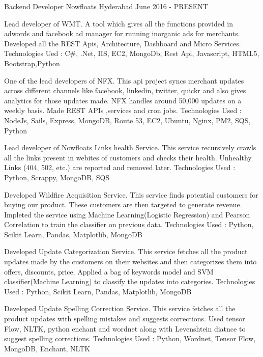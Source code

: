 

\begin{cventries}

  \cventry
    {Backend Developer} %
    {Nowfloats} %
    {Hyderabad} %
    {June 2016 - PRESENT} %
    {
      \begin{cvitems} %
        \item {Lead developer of WMT. A tool which gives all the functions provided in adwords and facebook ad manager for running inorganic ads for merchants. Developed all the REST Apis, Architecture, Dashboard and Micro Services. Technologies Ued : C\#, .Net, IIS, EC2, MongoDb, Rest Api, Javascript, HTML5, Bootstrap,Python}
        \item {One of the lead developers of NFX. This api project syncs merchant updates across different channels like facebook, linkedin, twitter, quickr and also gives analytics for those updates made. NFX handles around 50,000 updates on a weekly basis. Made REST APIs ,services and cron jobs. Technologies Used : NodeJs, Sails, Express, MongoDB, Route 53, EC2, Ubuntu, Nginx, PM2, SQS, Python}
        \item {Lead developer of Nowfloats Links health Service. This service recursively crawls all the links present in webites of customers and checks their health. Unhealthy Links (404, 502, etc.) are reported and removed later. Technologies Used : Python, Scrappy, MongoDB, SQS  }
        \item {Developed Wildfire Acquisition Service. This service finds potential customers for buying our product. These customers are then targeted to generate revenue. Impleted the service using Machine Learning(Logistic Regression) and Pearson Correlation to train the classifier on previous data. Technologies Used : Python, Scikit Learn, Pandas, Matplotlib, MongoDB  }
        \item {Developed Update Categorization Service. This service fetches all the product updates made by the customers on their websites and then categorizes them into offers, discounts, price. Applied a bag of keywords model and SVM classifier(Machine Learning) to classify the updates into categories. Technologies Used : Python, Scikit Learn, Pandas, Matplotlib, MongoDB  }
        \item {Developed Update Spelling Correction Service. This service fetches all the product updates with spelling mistakes and suggests corrections. Used tensor Flow, NLTK, python enchant and wordnet along with Levenshtein diatnce to suggest spelling corrections. Technologies Used : Python, Wordnet, Tensor Flow, MongoDB, Enchant, NLTK  }
      \end{cvitems}
    }


\end{cventries}
